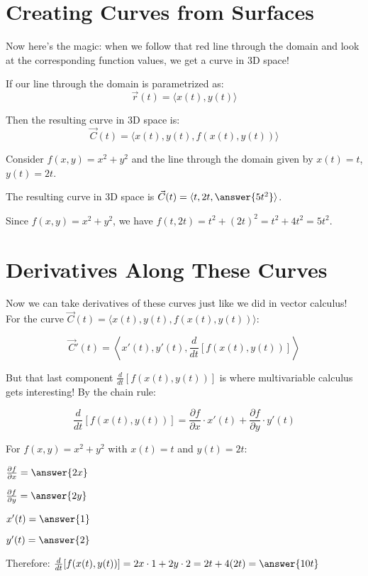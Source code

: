 \documentclass{ximera}
\begin{document}
\section*{Creating Curves from Surfaces}

Now here's the magic: when we follow that red line through the domain and look at the corresponding function values, we get a curve in 3D space!

If our line through the domain is parametrized as:
$$\vec{r}(t) = \langle x(t), y(t) \rangle$$

Then the resulting curve in 3D space is:
$$\vec{C}(t) = \langle x(t), y(t), f(x(t), y(t)) \rangle$$

\begin{exercise}
Consider $f(x,y) = x^2 + y^2$ and the line through the domain given by $x(t) = t$, $y(t) = 2t$.

The resulting curve in 3D space is $\vec{C}(t) = \langle t, 2t, \answer{5t^2} \rangle$.

\begin{feedback}
Since $f(x,y) = x^2 + y^2$, we have $f(t, 2t) = t^2 + (2t)^2 = t^2 + 4t^2 = 5t^2$.
\end{feedback}
\end{exercise}

\section*{Derivatives Along These Curves}

Now we can take derivatives of these curves just like we did in vector calculus! For the curve $\vec{C}(t) = \langle x(t), y(t), f(x(t), y(t)) \rangle$:

$$\vec{C}'(t) = \left\langle x'(t), y'(t), \frac{d}{dt}[f(x(t), y(t))] \right\rangle$$

But that last component $\frac{d}{dt}[f(x(t), y(t))]$ is where multivariable calculus gets interesting! By the chain rule:

$$\frac{d}{dt}[f(x(t), y(t))] = \frac{\partial f}{\partial x} \cdot x'(t) + \frac{\partial f}{\partial y} \cdot y'(t)$$

\begin{exercise}
For $f(x,y) = x^2 + y^2$ with $x(t) = t$ and $y(t) = 2t$:

$\frac{\partial f}{\partial x} = \answer{2x}$

$\frac{\partial f}{\partial y} = \answer{2y}$

$x'(t) = \answer{1}$

$y'(t) = \answer{2}$

Therefore: $\frac{d}{dt}[f(x(t), y(t))] = 2x \cdot 1 + 2y \cdot 2 = 2t + 4(2t) = \answer{10t}$
\end{exercise}
\end{document}
